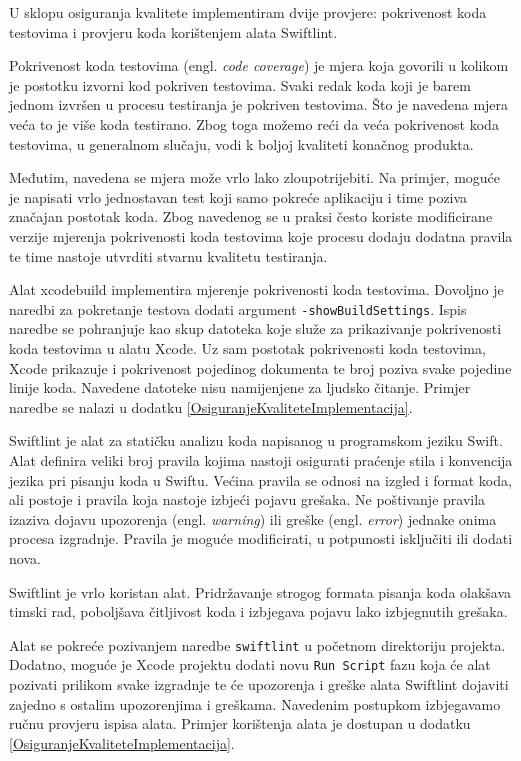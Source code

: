 \documentclass[times, utf8, diplomski, numeric]{fer}
\newcommand{\eng}[1]{(engl. \textit{#1})}
\begin{document}
U sklopu osiguranja kvalitete implementiram dvije provjere: pokrivenost koda testovima i provjeru koda korištenjem alata Swiftlint.

Pokrivenost koda testovima \eng{code coverage} je mjera koja govorili u kolikom je postotku izvorni kod pokriven testovima. Svaki redak koda koji je barem jednom izvršen u procesu testiranja je pokriven testovima. Što je navedena mjera veća to je više koda testirano. Zbog toga možemo reći da veća pokrivenost koda testovima, u generalnom slučaju, vodi k boljoj kvaliteti konačnog produkta.

Međutim, navedena se mjera može vrlo lako zloupotrijebiti. Na primjer, moguće je napisati vrlo jednostavan test koji samo pokreće aplikaciju i time poziva značajan postotak koda. Zbog navedenog se u praksi često koriste modificirane verzije mjerenja pokrivenosti koda testovima koje procesu dodaju dodatna pravila te time nastoje utvrditi stvarnu kvalitetu testiranja\citep{wiki:CodeCoverage}.

Alat xcodebuild implementira mjerenje pokrivenosti koda testovima. Dovoljno je naredbi za pokretanje testova dodati argument \verb|-showBuildSettings|. Ispis naredbe se pohranjuje kao skup datoteka koje služe za prikazivanje pokrivenosti koda testovima u alatu Xcode. Uz sam postotak pokrivenosti koda testovima, Xcode prikazuje i pokrivenost pojedinog dokumenta te broj poziva svake pojedine linije koda. Navedene datoteke nisu namijenjene za ljudsko čitanje. Primjer naredbe se nalazi u dodatku \ref{OsiguranjeKvaliteteImplementacija}.

Swiftlint je alat za statičku analizu koda napisanog u programskom jeziku Swift. Alat definira veliki broj pravila kojima nastoji osigurati praćenje stila i konvencija jezika pri pisanju koda u Swiftu\citep{SwiftLint}. Većina pravila se odnosi na izgled i format koda, ali postoje i pravila koja nastoje izbjeći pojavu grešaka. Ne poštivanje pravila izaziva dojavu upozorenja \eng{warning} ili greške \eng{error} jednake onima procesa izgradnje. Pravila je moguće modificirati, u potpunosti isključiti ili dodati nova.

Swiftlint je vrlo koristan alat. Pridržavanje strogog formata pisanja koda olakšava timski rad, poboljšava čitljivost koda i izbjegava pojavu lako izbjegnutih grešaka.

Alat se pokreće pozivanjem naredbe \verb|swiftlint| u početnom direktoriju projekta. Dodatno, moguće je Xcode projektu dodati novu \verb|Run Script| fazu koja će alat pozivati prilikom svake izgradnje te će upozorenja i greške alata Swiftlint dojaviti zajedno s ostalim upozorenjima i greškama. Navedenim postupkom izbjegavamo ručnu provjeru ispisa alata. Primjer korištenja alata je dostupan u dodatku \ref{OsiguranjeKvaliteteImplementacija}.
\end{document}
